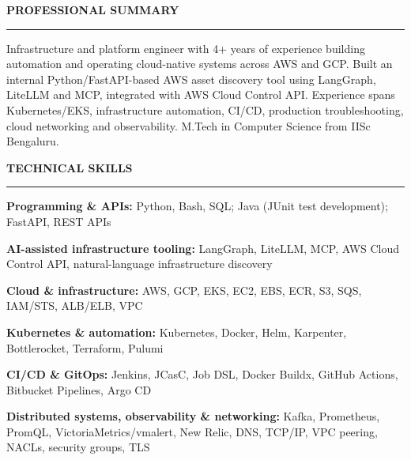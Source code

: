 \documentclass{resume} %
\def\sectionskip{\vspace{0.42em}}
\def\sectionlineskip{\vspace{0.12em}}
\renewenvironment{rSection}[1]{%
  \sectionskip
  \MakeUppercase{\textbf{#1}}%
  \sectionlineskip
  \hrule
  \begin{list}{}{%
    \setlength{\leftmargin}{0em}%
    \setlength{\topsep}{0.22em}%
    \setlength{\partopsep}{0pt}%
    \setlength{\parsep}{0pt}%
    \setlength{\itemsep}{0pt}%
  }%
  \item[]%
}{%
  \end{list}%
}
\newcommand{\skill}[2]{\textbf{#1:} #2\par\vspace{0.08em}}
\begin{document}
\begin{rSection}{Professional Summary}

Infrastructure and platform engineer with 4+ years of experience building automation and operating cloud-native systems across AWS and GCP. Built an internal Python/FastAPI-based AWS asset discovery tool using LangGraph, LiteLLM and MCP, integrated with AWS Cloud Control API. Experience spans Kubernetes/EKS, infrastructure automation, CI/CD, production troubleshooting, cloud networking and observability. M.Tech in Computer Science from IISc Bengaluru.

\end{rSection}

\begin{rSection}{Technical Skills}

\skill{Programming \& APIs}{Python, Bash, SQL; Java (JUnit test development); FastAPI, REST APIs}
\skill{AI-assisted infrastructure tooling}{LangGraph, LiteLLM, MCP, AWS Cloud Control API, natural-language infrastructure discovery}
\skill{Cloud \& infrastructure}{AWS, GCP, EKS, EC2, EBS, ECR, S3, SQS, IAM/STS, ALB/ELB, VPC}
\skill{Kubernetes \& automation}{Kubernetes, Docker, Helm, Karpenter, Bottlerocket, Terraform, Pulumi}
\skill{CI/CD \& GitOps}{Jenkins, JCasC, Job DSL, Docker Buildx, GitHub Actions, Bitbucket Pipelines, Argo CD}
\skill{Distributed systems, observability \& networking}{Kafka, Prometheus, PromQL, VictoriaMetrics/vmalert, New Relic, DNS, TCP/IP, VPC peering, NACLs, security groups, TLS}

\end{rSection}
\end{document}
